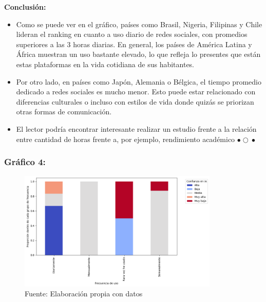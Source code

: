 \documentclass[12pt, a4paper]{article}
\begin{document}
\newpage
\textbf{Conclusión:}  
\begin{itemize}
    \item Como se puede ver en el gráfico, países como Brasil, Nigeria, Filipinas y Chile lideran el ranking en cuanto a uso diario de redes sociales, con promedios superiores a las 3 horas diarias. En general, los países de América Latina y África muestran un uso bastante elevado, lo que refleja lo presentes que están estas plataformas en la vida cotidiana de sus habitantes.
    \item Por otro lado, en países como Japón, Alemania o Bélgica, el tiempo promedio dedicado a redes sociales es mucho menor. Esto puede estar relacionado con diferencias culturales o incluso con estilos de vida donde quizás se priorizan otras formas de comunicación.
    \item El lector podría encontrar interesante realizar un estudio frente a la relación entre cantidad de horas frente a, por ejemplo, rendimiento académico $\bullet{}\bigcirc{}\bullet{}$
\end{itemize}

\subsubsection*{Gráfico 4: }
\begin{figure}[H]
    \centering
    \includegraphics[width=0.85\textwidth]{Graficos/spin plot.png}
    \caption[4]{Fuente: Elaboración propia con datos}

\end{figure}
\end{document}

